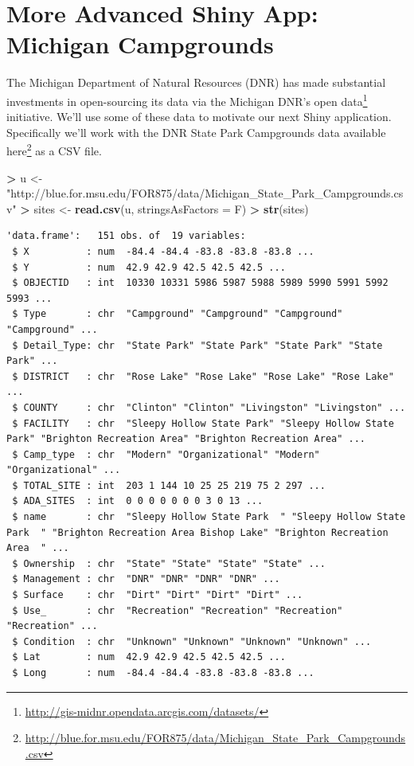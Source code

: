 \documentclass[]{krantz}
\makeatletter
\newenvironment{Shaded}{\begin{snugshade}}{\end{snugshade}}
\newcommand{\KeywordTok}[1]{\textcolor[rgb]{0.27,0.27,0.27}{\textbf{#1}}}
\newcommand{\DataTypeTok}[1]{\textcolor[rgb]{0.27,0.27,0.27}{#1}}
\newcommand{\StringTok}[1]{\textcolor[rgb]{0.5,0.5,0.5}{#1}}
\newcommand{\OperatorTok}[1]{\textcolor[rgb]{0.43,0.43,0.43}{\textbf{#1}}}
\newcommand{\NormalTok}[1]{#1}
\renewcommand{\href}[2]{#2\footnote{\url{#1}}}
\newenvironment{kframe}{%
\medskip{}
\setlength{\fboxsep}{.8em}
 \def\at@end@of@kframe{}%
 \ifinner\ifhmode%
  \def\at@end@of@kframe{\end{minipage}}%
  \begin{minipage}{\columnwidth}%
 \fi\fi%
 \def\FrameCommand##1{\hskip\@totalleftmargin \hskip-\fboxsep
 \colorbox{shadecolor}{##1}\hskip-\fboxsep
     \hskip-\linewidth \hskip-\@totalleftmargin \hskip\columnwidth}%
 \MakeFramed {\advance\hsize-\width
   \@totalleftmargin\z@ \linewidth\hsize
   \@setminipage}}%
 {\par\unskip\endMakeFramed%
 \at@end@of@kframe}
\renewenvironment{Shaded}{\begin{kframe}}{\end{kframe}}
\makeatother
\begin{document}
\section{More Advanced Shiny App: Michigan
Campgrounds}\label{more-advanced-shiny-app-michigan-campgrounds}

The Michigan Department of Natural Resources (DNR) has made substantial
investments in open-sourcing its data via the
\href{http://gis-midnr.opendata.arcgis.com/datasets/}{Michigan DNR's
open data} initiative. We'll use some of these data to motivate our next
Shiny application. Specifically we'll work with the DNR State Park
Campgrounds data available
\href{http://blue.for.msu.edu/FOR875/data/Michigan_State_Park_Campgrounds.csv}{here}
as a CSV file.

\begin{Shaded}
\begin{Highlighting}[]
\OperatorTok{>}\StringTok{ }\NormalTok{u <-}\StringTok{ "http://blue.for.msu.edu/FOR875/data/Michigan_State_Park_Campgrounds.csv"}
\OperatorTok{>}\StringTok{ }\NormalTok{sites <-}\StringTok{ }\KeywordTok{read.csv}\NormalTok{(u, }\DataTypeTok{stringsAsFactors =}\NormalTok{ F)}
\OperatorTok{>}\StringTok{ }\KeywordTok{str}\NormalTok{(sites)}
\end{Highlighting}
\end{Shaded}

\begin{verbatim}
'data.frame':   151 obs. of  19 variables:
 $ X          : num  -84.4 -84.4 -83.8 -83.8 -83.8 ...
 $ Y          : num  42.9 42.9 42.5 42.5 42.5 ...
 $ OBJECTID   : int  10330 10331 5986 5987 5988 5989 5990 5991 5992 5993 ...
 $ Type       : chr  "Campground" "Campground" "Campground" "Campground" ...
 $ Detail_Type: chr  "State Park" "State Park" "State Park" "State Park" ...
 $ DISTRICT   : chr  "Rose Lake" "Rose Lake" "Rose Lake" "Rose Lake" ...
 $ COUNTY     : chr  "Clinton" "Clinton" "Livingston" "Livingston" ...
 $ FACILITY   : chr  "Sleepy Hollow State Park" "Sleepy Hollow State Park" "Brighton Recreation Area" "Brighton Recreation Area" ...
 $ Camp_type  : chr  "Modern" "Organizational" "Modern" "Organizational" ...
 $ TOTAL_SITE : int  203 1 144 10 25 25 219 75 2 297 ...
 $ ADA_SITES  : int  0 0 0 0 0 0 0 3 0 13 ...
 $ name       : chr  "Sleepy Hollow State Park  " "Sleepy Hollow State Park  " "Brighton Recreation Area Bishop Lake" "Brighton Recreation Area  " ...
 $ Ownership  : chr  "State" "State" "State" "State" ...
 $ Management : chr  "DNR" "DNR" "DNR" "DNR" ...
 $ Surface    : chr  "Dirt" "Dirt" "Dirt" "Dirt" ...
 $ Use_       : chr  "Recreation" "Recreation" "Recreation" "Recreation" ...
 $ Condition  : chr  "Unknown" "Unknown" "Unknown" "Unknown" ...
 $ Lat        : num  42.9 42.9 42.5 42.5 42.5 ...
 $ Long       : num  -84.4 -84.4 -83.8 -83.8 -83.8 ...
\end{verbatim}
\end{document}
